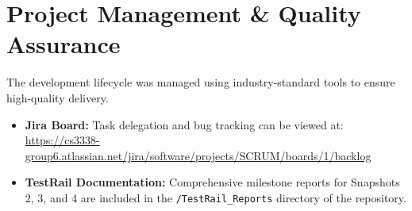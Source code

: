 \documentclass{article}
\begin{document}
\section{Project Management \& Quality Assurance}
The development lifecycle was managed using industry-standard tools to ensure high-quality delivery.
\begin{itemize}
    \item \textbf{Jira Board:} Task delegation and bug tracking can be viewed at: \\
    \url{https://cs3338-group6.atlassian.net/jira/software/projects/SCRUM/boards/1/backlog}
    \item \textbf{TestRail Documentation:} Comprehensive milestone reports for Snapshots 2, 3, and 4 are included in the \texttt{/TestRail_Reports} directory of the repository.
\end{itemize}
\end{document}
